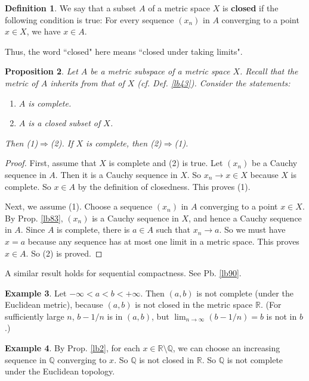 \documentclass[12pt,b5paper,notitlepage]{article}
\theoremstyle{definition}
\newtheorem{df}{Definition}[section]
\newtheorem{eg}[df]{Example}
\theoremstyle{plain}
\newtheorem{pp}[df]{Proposition}
\newcommand{\Qbb}{\mathbb Q}
\newcommand{\Rbb}{\mathbb R}
\numberwithin{equation}{section}
\begin{document}
\begin{df}\label{lb99}
We say that a subset $A$ of a metric space $X$ is \textbf{closed}  if the following condition is true: For every sequence $(x_n)$ in $A$ converging to a point $x\in X$, we have $x\in A$.
\end{df}


Thus, the word ``closed" here means ``closed under taking limits".


\begin{pp}\label{lb86}
Let $A$ be a metric subspace of a metric space $X$. Recall  that the metric of $A$ inherits from that of $X$ (cf. Def. \ref{lb43}). Consider the statements:
\begin{enumerate}[label=(\arabic*)]
\item $A$ is complete.
\item $A$ is a closed subset of $X$.
\end{enumerate}
Then (1)$\Rightarrow$(2). If $X$ is complete, then (2)$\Rightarrow$(1).
\end{pp}


\begin{proof}
First, assume that $X$ is complete and (2) is true. Let $(x_n)$ be a Cauchy sequence in $A$. Then it is a Cauchy sequence in $X$. So $x_n\rightarrow x\in X$ because $X$ is complete. So $x\in A$ by the definition of closedness. This proves (1).

Next, we assume (1). Choose a sequence $(x_n)$ in $A$ converging to a point $x\in X$. By Prop. \ref{lb83}, $(x_n)$ is a Cauchy sequence in $X$, and hence a Cauchy sequence in $A$. Since $A$ is complete, there is $a\in A$ such that $x_n\rightarrow a$. So we must have $x=a$ because any sequence has at most one limit in a metric space. This proves $x\in A$. So (2) is proved.
\end{proof}

A similar result holds for sequential compactness. See Pb. \ref{lb90}.

\begin{eg}
Let $-\infty<a<b<+\infty$. Then $(a,b)$ is not complete (under the Euclidean metric), because $(a,b)$ is not closed in the metric space $\Rbb$. (For sufficiently large $n$, $b-1/n$ is in $(a,b)$, but $\lim_{n\rightarrow\infty} (b-1/n)=b$ is not in $b$.) 
\end{eg}

\begin{eg}
By Prop. \ref{lb2}, for each $x\in\Rbb\setminus\Qbb$, we can choose an increasing sequence in $\Qbb$ converging to $x$. So $\Qbb$ is not closed in $\Rbb$. So $\Qbb$ is not complete under the Euclidean topology.
\end{eg}
\end{document}
